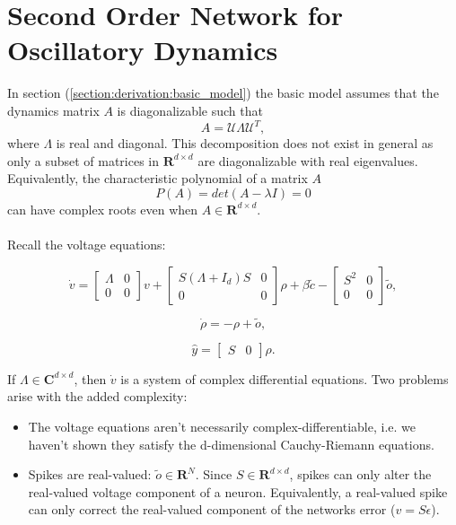 \section{Second Order Network for Oscillatory Dynamics}


In section (\ref{section:derivation:basic_model}) the basic model assumes that the dynamics matrix $A$ is diagonalizable such that 
$$
A = \mathcal{U} \Lambda \mathcal{U}^T, 
$$
where $\Lambda$ is real and diagonal. This decomposition does not exist in general as only a subset of matrices in $\mathbf{R}^{d \times d}$ are diagonalizable with real eigenvalues. Equivalently, the characteristic polynomial of a matrix $A$
$$
P(A) = det(A - \lambda I) = 0
$$
can have complex roots even when $A \in \mathbf{R}^{d \times d}$. 
\\
\\
Recall the voltage equations:

$$
\dot{v}
= 
\begin{bmatrix}
\Lambda & 0
\\
0 & 0
\end{bmatrix}
v +
\begin{bmatrix}
S \left(\Lambda + I_d \right) S & 0
\\
0 & 0
\end{bmatrix}
  \rho 
+ \beta \tilde{c}  
  - 
 \begin{bmatrix}
S^2 & 0
\\
0 & 0
\end{bmatrix}
    \tilde{o},
$$

$$
\dot{\rho} = -\rho + \tilde{o},
$$

$$
\hat{y} = \begin{bmatrix}
S & 0
\end{bmatrix}
\rho.
$$


If $\Lambda \in \mathbf{C}^{d \times d}$, then $\dot{v}$ is a system of complex differential equations. Two problems arise with the added complexity:
\begin{itemize}
\item The voltage equations aren't necessarily complex-differentiable, i.e. we haven't shown they satisfy the d-dimensional Cauchy-Riemann equations. 

\item Spikes are real-valued: $
\tilde{o} \in \mathbf{R}^N.
$
Since $S \in \mathbf{R}^{d \times d}$, spikes can only alter the real-valued voltage component of a neuron. Equivalently, a real-valued spike can only correct the real-valued component of the networks error ($v = S \epsilon$).

\end{itemize}


